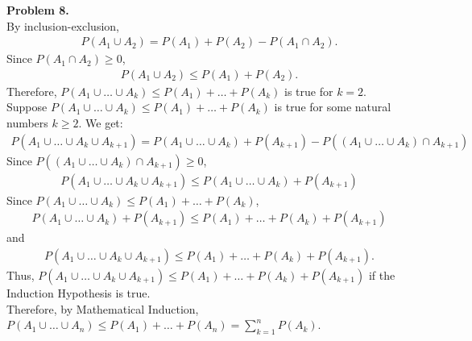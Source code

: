 \documentclass{article}
\begin{document}
\textbf{Problem 8.} \\
By inclusion-exclusion,
\begin{align}
    P(A_1 \cup A_2) = P(A_1) + P(A_2) - P(A_1 \cap A_2).
\end{align}
Since $P(A_1 \cap A_2) \ge 0$,
\begin{align}
    P(A_1 \cup A_2) \le P(A_1) + P(A_2).
\end{align}
Therefore, $P(A_1 \cup \dots \cup A_k) \le P(A_1) + \dots + P(A_k)$ is true for $k = 2$. \\
Suppose $P(A_1 \cup \dots \cup A_k) \le P(A_1) + \dots + P(A_k)$ is true for some natural numbers $k \ge 2$.
We get:
\begin{align}
    P(A_1 \cup \dots \cup A_k \cup A_{k+1}) = P(A_1 \cup \dots \cup A_k) + P(A_{k+1}) - P((A_1 \cup \dots \cup A_k) \cap A_{k+1}) 
\end{align}
Since $P((A_1 \cup \dots \cup A_k) \cap A_{k+1}) \ge 0$, 
\begin{align}
    P(A_1 \cup \dots \cup A_k \cup A_{k+1}) \le P(A_1 \cup \dots \cup A_k) + P(A_{k+1})
\end{align}
Since $P(A_1 \cup \dots \cup A_k) \le P(A_1) + \dots + P(A_k)$,
\begin{align}
    P(A_1 \cup \dots \cup A_k) + P(A_{k+1}) \le P(A_1) + \dots + P(A_k) + P(A_{k+1})
\end{align}
and 
\begin{align}
    P(A_1 \cup \dots \cup A_k \cup A_{k+1}) \le P(A_1) + \dots + P(A_k) + P(A_{k+1}).
\end{align}
Thus, $P(A_1 \cup \dots \cup A_k \cup A_{k+1}) \le P(A_1) + \dots + P(A_k) + P(A_{k+1})$ if the Induction Hypothesis is true. \\
Therefore, by Mathematical Induction, $P(A_1 \cup \dots \cup A_n) \le P(A_1) + \dots + P(A_n) = \sum_{k=1}^{n}P(A_k)$.
\end{document}
